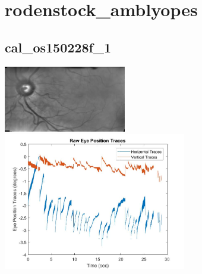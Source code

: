 \documentclass[11pt]{article}
\begin{document}
\section{rodenstock\_amblyopes}

\subsection{cal\_os150228f\_1}
\includegraphics[width=0.40\textwidth, valign=m]{referenceframes/rodenstock_amblyopes/cal_os150228f_1_dwt_nostim_gamscaled_bandfilt_refframe.jpg}
\includegraphics[width=0.60\textwidth, valign=m]{eyepositiontraces/rodenstock_amblyopes/cal_os150228f_1.jpg}\\
\end{document}
